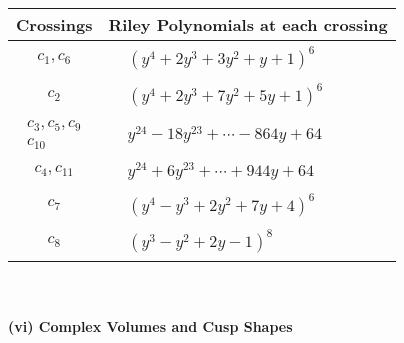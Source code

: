 \documentclass[1p]{elsarticle_modified}
\theoremstyle{definition}
\begin{document}
\begin{tabular}{m{50pt}|m{274pt}}
Crossings & \hspace{64pt}Riley Polynomials at each crossing \\
\hline $$\begin{aligned}c_{1},c_{6}\end{aligned}$$&$\begin{aligned}
&(y^4+2 y^3+3 y^2+y+1)^6
\end{aligned}$\\
\hline $$\begin{aligned}c_{2}\end{aligned}$$&$\begin{aligned}
&(y^4+2 y^3+7 y^2+5 y+1)^6
\end{aligned}$\\
\hline $$\begin{aligned}c_{3},c_{5},c_{9}\\c_{10}\end{aligned}$$&$\begin{aligned}
&y^{24}-18 y^{23}+\cdots-864 y+64
\end{aligned}$\\
\hline $$\begin{aligned}c_{4},c_{11}\end{aligned}$$&$\begin{aligned}
&y^{24}+6 y^{23}+\cdots+944 y+64
\end{aligned}$\\
\hline $$\begin{aligned}c_{7}\end{aligned}$$&$\begin{aligned}
&(y^4- y^3+2 y^2+7 y+4)^6
\end{aligned}$\\
\hline $$\begin{aligned}c_{8}\end{aligned}$$&$\begin{aligned}
&(y^3- y^2+2 y-1)^8
\end{aligned}$\\
\hline
\end{tabular}\\~\\
\newpage\flushleft \textbf{(vi) Complex Volumes and Cusp Shapes}
\end{document}
